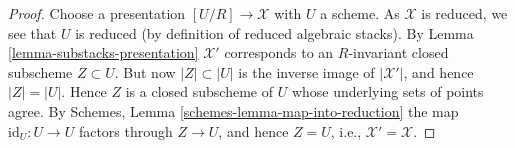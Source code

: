 \documentclass[10pt,a4paper]{amsart}
\theoremstyle{plain}
\theoremstyle{definition}
\theoremstyle{remark}
\numberwithin{equation}{subsection}
\begin{document}
\begin{proof}
Choose a presentation $[U/R] \to \mathcal{X}$ with $U$ a scheme.
As $\mathcal{X}$ is reduced, we see that $U$ is reduced (by definition
of reduced algebraic stacks). By
Lemma \ref{lemma-substacks-presentation}
$\mathcal{X}'$ corresponds to an $R$-invariant closed subscheme $Z \subset U$.
But now $|Z| \subset |U|$ is the inverse image of $|\mathcal{X}'|$, and
hence $|Z| = |U|$. Hence $Z$ is a closed subscheme of $U$ whose underlying
sets of points agree. By
Schemes, Lemma \ref{schemes-lemma-map-into-reduction}
the map $\text{id}_U : U \to U$ factors through $Z \to U$, and hence
$Z = U$, i.e., $\mathcal{X}' = \mathcal{X}$.
\end{proof}
\end{document}
